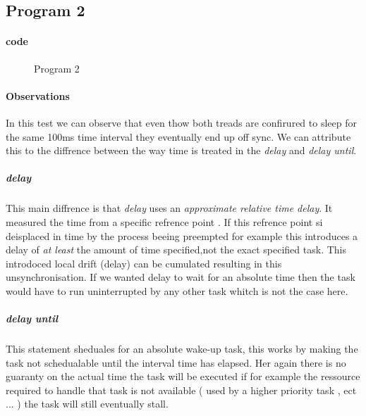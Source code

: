 \documentclass[10pt,a4paper]{article}
\begin{document}
\subsection{Program 2}
\paragraph{code}
\begin{figure}[H]
\begin{center}

\caption{Program 2}
\end{center}
\end{figure}

\paragraph{Observations}
In this test we can observe that even thow both treads are confirured to sleep for the same 100ms time interval they eventually end up off sync. We can attribute this to the diffrence between the way time is treated in the \emph{delay} and \emph{delay until}.
\\
\subparagraph{delay}
This main diffrence is that \emph{delay} uses an \textit{approximate relative time delay}. It measured the time from a specific refrence point . If this refrence point si deisplaced in time by the process beeing preempted for example this  introduces a delay of \emph{at least} the amount of time specified,not the exact specified task. This introdoced local drift (delay) can be cumulated resulting in this unsynchronisation.
If we wanted delay to wait for an absolute time then the task would have to run uninterrupted by any other task whitch is not the case here.
\subparagraph{delay until}
This statement sheduales for an absolute wake-up task, this works by making the task not schedualable until the interval time has elapsed. Her again there is no guaranty on the actual time the task will be executed if for example the ressource required to handle that task is not available ( used by a higher priority task , ect ... ) the task will still eventually stall. 
\end{document}
